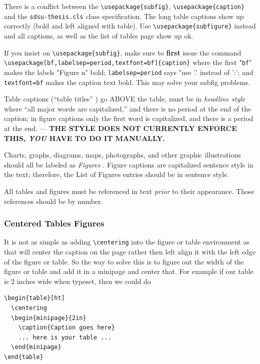 There is a conflict between the \verb+\usepackage{subfig}+,
\verb+\usepackage{caption}+ and the \verb+sdsu-thesis.cls+ class
specification.  The long table captions show up correctly (bold and
left aligned with table).  Use \verb+\usepackage{subfigure}+ instead
and all captions, as well as the list of tables page show up ok.

If you insist on \verb+\usepackage{subfig}+, make sure to
\textbf{first} issue the command
\verb+\usepackage[bf,labelsep=period,textfont=bf]{caption}+ where the
first "\verb+bf+" makes the labels "Figure n" bold;
\verb+labelsep=period+ says "use '.' instead of ':'; and
\verb+textfont=bf+ makes the caption text bold.  This may solve your
subfig problems.


Table captions (``table titles'' \cite{DTM2010spring}) go
ABOVE the table, must be
in \emph{headline style} where ``all major words are capitalized,''
and there is no period at the end of the caption; in figure captions
only the first word is capitalized, and there is a period at the
end. --- \textbf{THE STYLE DOES NOT CURRENTLY ENFORCE THIS, \emph{YOU}
  HAVE TO DO IT MANUALLY.}

Charts, graphs, diagrams, maps, photographs, and other graphic
illustrations should all be labeled as \emph{Figures} \cite[\S4.6.9,
and \S4.10.4]{DTM2010spring}.  Figure captions are capitalized
sentence style in the text; therefore, the List of Figures entries
should be in sentence style.

All tables and figures must be referenced in text \emph{prior} to
their appearance. Those references should be by number.



\subsubsection{Centered Tables Figures}
\label{sec::centered:tab:fig}

It is not as simple as adding \verb+\centering+ into the figure or
table environment as that will center the caption on the page rather
then left align it with the left edge of the figure or table.  So the
way to solve this is to figure out the width of the figure or table
and add it in a minipage and center that.  For example if our table is
2 inches wide when typeset, then we could do
\begin{verbatim}
\begin{table}[ht]
  \centering
  \begin{minipage}{2in}
    \caption{Caption goes here}
    ... here is your table ...
  \end{minipage}
\end{table}
\end{verbatim}




